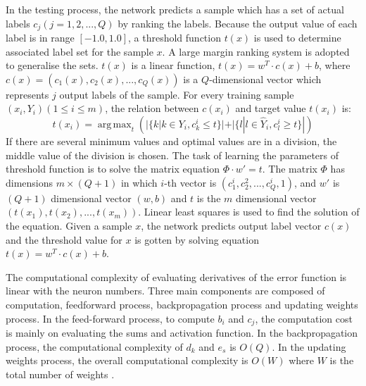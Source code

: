 In the testing process, the network predicts a sample which has a set of actual labels $c_{j} (j = 1,2,...,Q)$ by ranking the labels. Because the output value of each label is in range $[-1.0,1.0]$, a threshold function $t(x)$ is used to determine associated label set for the sample $x$. A large margin ranking system\citep{elisseeff2001kernel} is adopted to generalise the sets. $t(x)$ is a linear function, $t(x) = w^T\cdot c(x) + b$, where $c(x) = (c_{1}(x), c_{2}(x),...,c_{Q}(x))$ is a $Q$-dimensional vector which represents $j$ output labels of the sample. For every training sample $(x_{i}, Y_{i}) (1 \leq i \leq m)$, the relation between $c(x_{i})$ and target value $t(x_{i})$ is:
\begin{equation}\label{eq:MultiLableThreshFunc}
t(x_{i}) =  \operatorname{arg\,max}_t (|\{k|k \in Y_{i}, c_{k}^i \leq t\}| + |\{l|l \in \hat{Y}_{i}, c_{l}^i \geq t\}|) 
\end{equation}
If there are several minimum values and optimal values are in a division, the middle value of the division is chosen. The task of learning the parameters of threshold function is to solve the matrix equation $\Phi \cdot w' = t$. The matrix $\Phi$ has dimensions $m \times (Q + 1)$ in which $i$-th vector is $(c_{1}^i, c_{2}^2,...,c_{Q}^i,1)$, and $w'$ is $(Q+1)$ dimensional vector $(w,b)$ and $t$ is the $m$ dimensional vector $(t(x_{1}), t(x_{2}),...,t(x_{m}))$. Linear least squares is used to find the solution of the equation. Given a sample $x$, the network predicts output label vector $c(x)$ and the threshold value for $x$ is gotten by solving equation $t(x) = w^T \cdot c(x) + b$.

The computational complexity of evaluating derivatives of the error function is linear with the neuron numbers. Three main components are composed of computation, feedforward process, backpropagation process and updating weights process. In the feed-forward process, to compute $b_{i}$ and $c_{j}$, the computation cost is mainly on evaluating the sums and activation function. In the backpropagation process, the computational complexity of $d_{k}$ and $e_{s}$ is $O(Q)$. In the updating weights process, the overall computational complexity is $O(W)$ where $W$ is the total number of weights . 





















